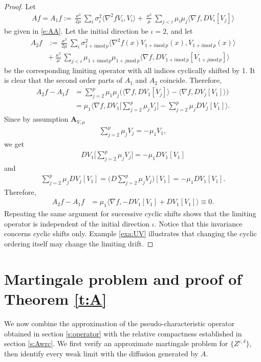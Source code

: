 \documentclass[10pt]{article}
\newcommand{\1}{1\!\!\!\;{\rm I}}
\theoremstyle{plain}
\theoremstyle{definition}
\newcommand{\e}{\varepsilon}
\newcommand{\ba}{\begin{equation}\begin{aligned}}
\newcommand{\ea}{\end{aligned}\end{equation}}
\numberwithin{equation}{section}
\begin{document}
\begin{proof}
Let
\ba
Af=A_1 f:=\frac{\varkappa^2}{2\mu} \sum_i  \sigma_{i}^2
\langle \nabla^2 fV_i , V_i \rangle
+\frac{\varkappa^2}{\mu} \sum_{j<i}
\mu_i\mu_j  \langle \nabla f ,  D V_i[V_j]  \rangle
\ea
be given in \eqref{e:AA}. Let the initial direction be $\iota=2$, and let
 \ba
A_2 f & :=\frac{\varkappa^2}{2\mu} \sum_i  \sigma_{1+i\mathrm{mod}\,p}^2
\langle \nabla^2 f(x)V_{1+i\mathrm{mod}\,p}(x), V_{1+i\mathrm{mod}\,p}(x)\rangle\\
&+\frac{\varkappa^2}{\mu}
\sum_{j<i} \mu_{1+i\mathrm{mod}\,p}\mu_{1+j\mathrm{mod}\,p}  \langle \nabla f,
D V_{1+i\mathrm{mod}\,p}[V_{1+j\mathrm{mod}\,p}] \rangle
\ea
be the corresponding limiting operator with all indices cyclically shifted by 1.
It is clear that the second order parts of $A_1$ and $A_2$ coincide. Therefore,
\ba
A_2f - A_1 f &=\sum_{j=2}^{p} \mu_1\mu_j \Big(\langle \nabla f,  D V_1[V_j] \rangle - \langle \nabla f,  D V_j[V_1] \rangle\Big)\\
&=\mu_1 \Big\langle\nabla f, DV_1\Big[ \sum_{j=2}^{p} \mu_jV_j   \Big]  -  \sum_{j=2}^{p} \mu_j DV_j[V_1]    \Big\rangle.
\ea
Since by assumption $\mathbf{A}_{V,\mu}$
\ba
 \sum_{j=2}^{p} \mu_j V_j=-\mu_1 V_1,
\ea
we get
\ba
  DV_1\Big[ \sum_{j=2}^{p} \mu_jV_j   \Big] =-\mu_1 DV_1[V_1]
\ea
and
\ba
\sum_{j=2}^{p} \mu_j DV_j[V_1] = \Big(D\sum_{j=2}^{p} \mu_jV_j\Big)[V_1]
=-\mu_1 DV_1[V_1].
\ea
Therefore,
\ba
A_2f - A_1f &=\mu_1 \Big\langle\nabla f, -DV_1 [ V_1 ] +   DV_1 [ V_1 ]    \Big\rangle\equiv  0.
\ea
Repeating the same argument for successive cyclic shifts shows that the limiting operator
is independent of the initial direction $\iota$. Notice that this invariance concerns cyclic shifts only.
Example \ref{exa:UV} illustrates that changing the cyclic ordering itself may change the limiting drift.
\end{proof}



\section{Martingale problem and proof of Theorem \ref{t:A}\label{s:Aconv}}

We now combine the approximation of the pseudo-characteristic operator obtained in section \ref{s:operator} with the relative
compactness established in section \ref{s:Awrc}. We first verify an approximate martingale problem for $\{Z^{\e,\delta}\}$,
then identify every weak limit with the diffusion generated by $A$.
\end{document}
